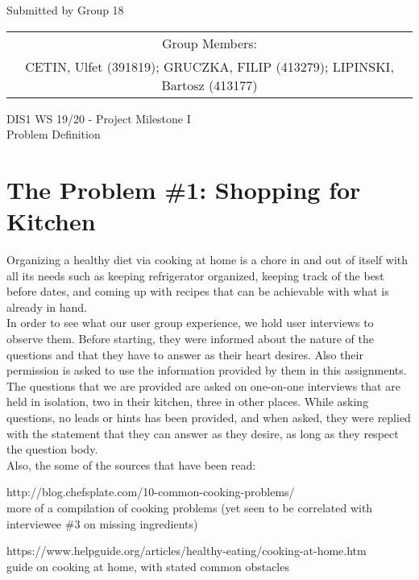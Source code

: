 \documentclass[a4paper,11pt,oneside]{scrreprt}
\begin{document}
\begin{center}
	Submitted by Group 18
	
	\bigskip
	
	\begin{tabular}{c}
	Group Members: \\
	CETIN, Ulfet (391819); GRUCZKA, FILIP (413279);	LIPINSKI, Bartosz (413177) \\
	\end{tabular}

	\bigskip
	
	DIS1 WS 19/20 - Project Milestone I\\
	Problem Definition
	
\end{center}
\vspace{0cm}

\begingroup
\let\clearpage\relax
	\chapter{The Problem \#1: Shopping for Kitchen}
\endgroup
	
		\indent Organizing a healthy diet via cooking at home is a chore in and out of itself with all its needs such as keeping refrigerator organized, keeping track of the best before dates, and coming up with recipes that can be achievable with what is already in hand.\\
		
		In order to see what our user group experience, we hold user interviews to observe them. Before starting, they were informed about the nature of the questions and that they have to answer as their heart desires. Also their permission is asked to use the information provided by them in this assignments. The questions that we are provided are asked on one-on-one interviews that are held in isolation, two in their kitchen, three in other places. While asking questions, no leads or hints has been provided, and when asked, they were replied with the statement that they can answer as they desire, as long as they respect the question body.\\
		
		Also, the some of the sources that have been read:
			\begin{compactitem}
				\item http://blog.chefsplate.com/10-common-cooking-problems/\\
				more of a compilation of cooking problems (yet seen to be correlated with interviewee \#3 on missing ingredients)
				
				\item https://www.helpguide.org/articles/healthy-eating/cooking-at-home.htm\\
				guide on cooking at home, with stated common obstacles
				
				
			\end{compactitem}
		
\end{document}
